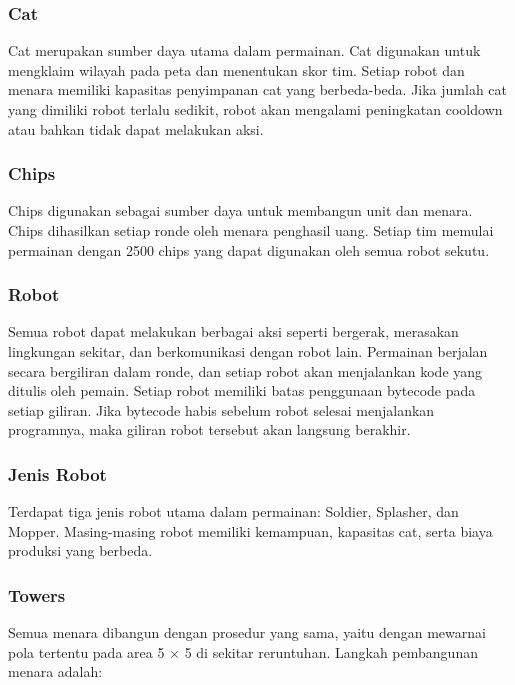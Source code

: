 \documentclass{article}
\begin{document}
\subsubsection{Cat}

Cat merupakan sumber daya utama dalam permainan. Cat digunakan untuk mengklaim wilayah pada 
peta dan menentukan skor tim.  
Setiap robot dan menara memiliki kapasitas penyimpanan cat yang berbeda-beda. Jika jumlah cat 
yang dimiliki robot terlalu sedikit, robot akan mengalami peningkatan cooldown atau bahkan tidak 
dapat melakukan aksi.  


\subsubsection{Chips}

Chips digunakan sebagai sumber daya untuk membangun unit dan menara. Chips dihasilkan setiap 
ronde oleh menara penghasil uang.  
Setiap tim memulai permainan dengan 2500 chips yang dapat digunakan oleh semua robot sekutu. 


\subsubsection{Robot}

Semua robot dapat melakukan berbagai aksi seperti bergerak, merasakan lingkungan sekitar, dan 
berkomunikasi dengan robot lain. Permainan berjalan secara bergiliran dalam ronde, dan setiap 
robot akan menjalankan kode yang ditulis oleh pemain.  
Setiap robot memiliki batas penggunaan bytecode pada setiap giliran. Jika bytecode habis sebelum 
robot selesai menjalankan programnya, maka giliran robot tersebut akan langsung berakhir.  


\subsubsection{Jenis Robot}

Terdapat tiga jenis robot utama dalam permainan: Soldier, Splasher, dan Mopper.  
Masing-masing robot memiliki kemampuan, kapasitas cat, serta biaya produksi yang berbeda.  


\subsubsection{Towers}

Semua menara dibangun dengan prosedur yang sama, yaitu dengan mewarnai pola tertentu pada 
area 5 $\times$ 5 di sekitar reruntuhan.  
Langkah pembangunan menara adalah:  
\end{document}
